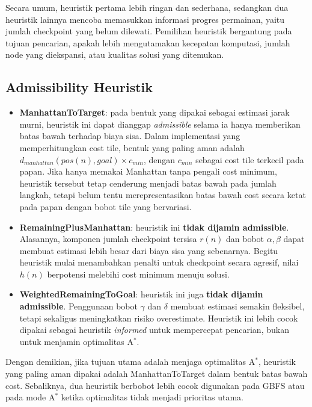 Secara umum, heuristik pertama lebih ringan dan sederhana, sedangkan dua heuristik lainnya mencoba memasukkan informasi progres permainan, yaitu jumlah checkpoint yang belum dilewati. Pemilihan heuristik bergantung pada tujuan pencarian, apakah lebih mengutamakan kecepatan komputasi, jumlah node yang diekspansi, atau kualitas solusi yang ditemukan.

\subsection{Admissibility Heuristik}
\begin{itemize}
    \item \textbf{ManhattanToTarget}: pada bentuk yang dipakai sebagai estimasi jarak murni, heuristik ini dapat dianggap \emph{admissible} selama ia hanya memberikan batas bawah terhadap biaya sisa. Dalam implementasi yang memperhitungkan cost tile, bentuk yang paling aman adalah $d_{manhattan}(pos(n), goal) \times c_{min}$, dengan $c_{min}$ sebagai cost tile terkecil pada papan. Jika hanya memakai Manhattan tanpa pengali cost minimum, heuristik tersebut tetap cenderung menjadi batas bawah pada jumlah langkah, tetapi belum tentu merepresentasikan batas bawah cost secara ketat pada papan dengan bobot tile yang bervariasi.

    \item \textbf{RemainingPlusManhattan}: heuristik ini \textbf{tidak dijamin admissible}. Alasannya, komponen jumlah checkpoint tersisa $r(n)$ dan bobot $\alpha, \beta$ dapat membuat estimasi lebih besar dari biaya sisa yang sebenarnya. Begitu heuristik mulai menambahkan penalti untuk checkpoint secara agresif, nilai $h(n)$ berpotensi melebihi cost minimum menuju solusi.

    \item \textbf{WeightedRemainingToGoal}: heuristik ini juga \textbf{tidak dijamin admissible}. Penggunaan bobot $\gamma$ dan $\delta$ membuat estimasi semakin fleksibel, tetapi sekaligus meningkatkan risiko overestimate. Heuristik ini lebih cocok dipakai sebagai heuristik \emph{informed} untuk mempercepat pencarian, bukan untuk menjamin optimalitas A$^\ast$.
\end{itemize}

Dengan demikian, jika tujuan utama adalah menjaga optimalitas A$^\ast$, heuristik yang paling aman dipakai adalah ManhattanToTarget dalam bentuk batas bawah cost. Sebaliknya, dua heuristik berbobot lebih cocok digunakan pada GBFS atau pada mode A$^\ast$ ketika optimalitas tidak menjadi prioritas utama.

